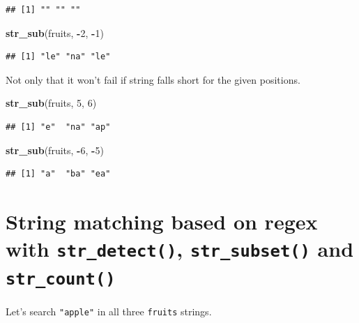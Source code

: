 \documentclass[
]{book}
\newenvironment{Shaded}{\begin{snugshade}}{\end{snugshade}}
\newcommand{\DecValTok}[1]{\textcolor[rgb]{0.00,0.00,0.81}{#1}}
\newcommand{\FunctionTok}[1]{\textcolor[rgb]{0.13,0.29,0.53}{\textbf{#1}}}
\newcommand{\NormalTok}[1]{#1}
\newcommand{\SpecialCharTok}[1]{\textcolor[rgb]{0.81,0.36,0.00}{\textbf{#1}}}
\begin{document}
\begin{verbatim}
## [1] "" "" ""
\end{verbatim}

\begin{Shaded}
\begin{Highlighting}[]
\FunctionTok{str\_sub}\NormalTok{(fruits, }\SpecialCharTok{{-}}\DecValTok{2}\NormalTok{, }\SpecialCharTok{{-}}\DecValTok{1}\NormalTok{)}
\end{Highlighting}
\end{Shaded}

\begin{verbatim}
## [1] "le" "na" "le"
\end{verbatim}

Not only that it won't fail if string falls short for the given positions.

\begin{Shaded}
\begin{Highlighting}[]
\FunctionTok{str\_sub}\NormalTok{(fruits, }\DecValTok{5}\NormalTok{, }\DecValTok{6}\NormalTok{)}
\end{Highlighting}
\end{Shaded}

\begin{verbatim}
## [1] "e"  "na" "ap"
\end{verbatim}

\begin{Shaded}
\begin{Highlighting}[]
\FunctionTok{str\_sub}\NormalTok{(fruits, }\SpecialCharTok{{-}}\DecValTok{6}\NormalTok{, }\SpecialCharTok{{-}}\DecValTok{5}\NormalTok{)}
\end{Highlighting}
\end{Shaded}

\begin{verbatim}
## [1] "a"  "ba" "ea"
\end{verbatim}

\hypertarget{string-matching-based-on-regex-with-str_detect-str_subset-and-str_count}{%
\section{\texorpdfstring{String matching based on regex with \texttt{str\_detect()}, \texttt{str\_subset()} and \texttt{str\_count()}}{String matching based on regex with str\_detect(), str\_subset() and str\_count()}}\label{string-matching-based-on-regex-with-str_detect-str_subset-and-str_count}}

Let's search \texttt{"apple"} in all three \texttt{fruits} strings.
\end{document}
